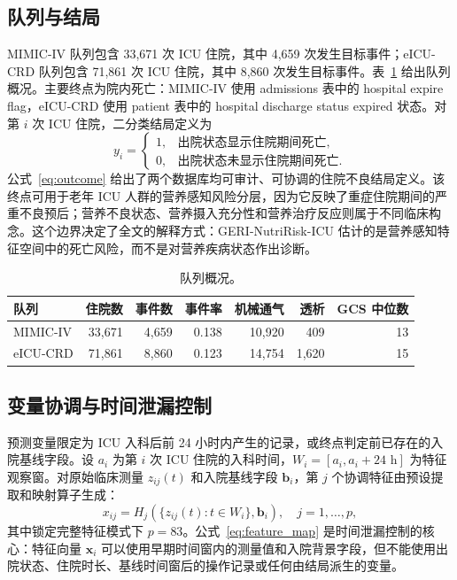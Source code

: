 \documentclass[11pt]{ctexart}
\begin{document}
\subsection{队列与结局}
MIMIC-IV 队列包含 33,671 次 ICU 住院，其中 4,659 次发生目标事件；eICU-CRD 队列包含 71,861 次 ICU 住院，其中 8,860 次发生目标事件。表~\ref{tab:cohort} 给出队列概况。主要终点为院内死亡：MIMIC-IV 使用 admissions 表中的 hospital expire flag，eICU-CRD 使用 patient 表中的 hospital discharge status expired 状态。对第 $i$ 次 ICU 住院，二分类结局定义为
\begin{equation}
y_i =
\begin{cases}
1, & \text{出院状态显示住院期间死亡},\\
0, & \text{出院状态未显示住院期间死亡}.
\end{cases}
\label{eq:outcome}
\end{equation}
公式~\ref{eq:outcome} 给出了两个数据库均可审计、可协调的住院不良结局定义。该终点可用于老年 ICU 人群的营养感知风险分层，因为它反映了重症住院期间的严重不良预后；营养不良状态、营养摄入充分性和营养治疗反应则属于不同临床构念。这个边界决定了全文的解释方式：GERI-NutriRisk-ICU 估计的是营养感知特征空间中的死亡风险，而不是对营养疾病状态作出诊断。

\begin{table}[htbp]
\centering
\caption{队列概况。}
\label{tab:cohort}
\begin{tabular}{lrrrrrr}
\toprule
队列 & 住院数 & 事件数 & 事件率 & 机械通气 & 透析 & GCS 中位数\\
\midrule
MIMIC-IV & 33,671 & 4,659 & 0.138 & 10,920 & 409 & 13\\
eICU-CRD & 71,861 & 8,860 & 0.123 & 14,754 & 1,620 & 15\\
\bottomrule
\end{tabular}
\end{table}

\subsection{变量协调与时间泄漏控制}
预测变量限定为 ICU 入科后前 24 小时内产生的记录，或终点判定前已存在的入院基线字段。设 $a_i$ 为第 $i$ 次 ICU 住院的入科时间，$W_i=[a_i,a_i+24\text{ h}]$ 为特征观察窗。对原始临床测量 $z_{ij}(t)$ 和入院基线字段 $\mathbf{b}_{i}$，第 $j$ 个协调特征由预设提取和映射算子生成：
\begin{equation}
x_{ij}=H_j\left(\{z_{ij}(t):t\in W_i\},\mathbf{b}_{i}\right),\quad j=1,\ldots,p,
\label{eq:feature_map}
\end{equation}
其中锁定完整特征模式下 $p=83$。公式~\ref{eq:feature_map} 是时间泄漏控制的核心：特征向量 $\mathbf{x}_{i}$ 可以使用早期时间窗内的测量值和入院背景字段，但不能使用出院状态、住院时长、基线时间窗后的操作记录或任何由结局派生的变量。
\end{document}
